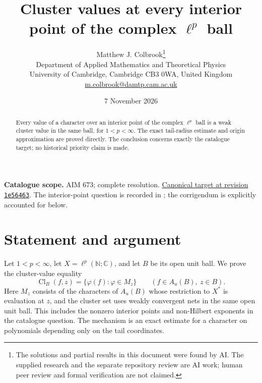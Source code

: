 \documentclass[11pt,a4paper]{article}
\theoremstyle{remark}
\begin{document}
\title{Cluster values at every interior point of the complex \texorpdfstring{$\ell^p$}{ell-p} ball}
\author{Matthew J. Colbrook\thanks{The solutions and partial results in this document were found by AI. The supplied research and the separate repository review are AI work; human peer review and formal verification are not claimed.}\\[4pt]
\small Department of Applied Mathematics and Theoretical Physics\\
\small University of Cambridge, Cambridge CB3 0WA, United Kingdom\\
\small\href{mailto:m.colbrook@damtp.cam.ac.uk}{m.colbrook@damtp.cam.ac.uk}}
\date{7 November 2026}
\maketitle
\begin{abstract}
Every value of a character over an interior point of the complex $\ell^p$ ball is a weak cluster value in the same ball, for $1<p<\infty$. The exact tail-radius estimate and origin approximation are proved directly. The conclusion concerns exactly the catalogue target; no historical priority claim is made.
\end{abstract}
\noindent\textbf{Catalogue scope.} AIM 673; complete resolution. \href{https://github.com/MColbrook/AIM/blob/1e564633494c109edfd3ec46da1366adcff925a5/problems/673-cluster-values-on-the-complex-ell-p-ball.md}{Canonical target at revision \texttt{1e56463}}.
The interior-point question is recorded in \cite[Question 8]{CarandoQuestion}; the corrigendum is explicitly accounted for below.

\section{Statement and argument}
\label{sec:673}

Let $1<p<\infty$, let $X=\ell^p(\mathbb N;\mathbb C)$, and let
$B$ be its open unit ball.  We prove the cluster-value equality
\begin{equation}
 \operatorname{Cl}_B(f,z)=\{\varphi(f):\varphi\in M_z\}
 \qquad(f\in A_u(B),\ z\in B).
 \label{eq:673-1}
\end{equation}
Here $M_z$ consists of the characters of $A_u(B)$ whose restriction
to $X^*$ is evaluation at $z$, and the cluster set uses weakly
convergent nets in the same open unit ball.  This includes the
nonzero interior points and non-Hilbert exponents in the catalogue
question.  The mechanism is an exact estimate for a character on
polynomials depending only on the tail coordinates.
\end{document}
